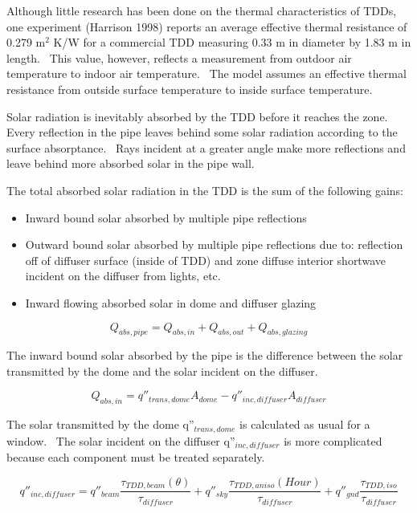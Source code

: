 Although little research has been done on the thermal characteristics of TDDs, one experiment (Harrison 1998) reports an average effective thermal resistance of 0.279 m\(^{2}\) K/W for a commercial TDD measuring 0.33 m in diameter by 1.83 m in length.~ This value, however, reflects a measurement from outdoor air temperature to indoor air temperature.~ The model assumes an effective thermal resistance from outside surface temperature to inside surface temperature.

Solar radiation is inevitably absorbed by the TDD before it reaches the zone.~ Every reflection in the pipe leaves behind some solar radiation according to the surface absorptance.~ Rays incident at a greater angle make more reflections and leave behind more absorbed solar in the pipe wall.

The total absorbed solar radiation in the TDD is the sum of the following gains:

\begin{itemize}
\item
  Inward bound solar absorbed by multiple pipe reflections
\item
  Outward bound solar absorbed by multiple pipe reflections due to: reflection off of diffuser surface (inside of TDD) and zone diffuse interior shortwave incident on the diffuser from lights, etc.
\item
  Inward flowing absorbed solar in dome and diffuser glazing
\end{itemize}

\begin{equation}
{Q_{abs,pipe}} = {Q_{abs,in}} + {Q_{abs,out}} + {Q_{abs,glazing}}
\end{equation}

The inward bound solar absorbed by the pipe is the difference between the solar transmitted by the dome and the solar incident on the diffuser.

\begin{equation}
{Q_{abs,in}} = {q''_{trans,dome}}{A_{dome}} - {q''_{inc,diffuser}}{A_{diffuser}}
\end{equation}

The solar transmitted by the dome q''\(_{trans,dome}\) is calculated as usual for a window.~ The solar incident on the diffuser q''\(_{inc,diffuser}\) is more complicated because each component must be treated separately.

\begin{equation}
{q''_{inc,diffuser}} = {q''_{beam}}\frac{{{\tau_{TDD,beam}}(\theta )}}{{{\tau_{diffuser}}}} + {q''_{sky}}\frac{{{\tau_{TDD,aniso}}(Hour)}}{{{\tau_{diffuser}}}} + {q''_{gnd}}\frac{{{\tau_{TDD,iso}}}}{{{\tau_{diffuser}}}}
\end{equation}

